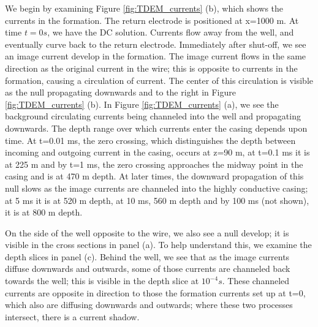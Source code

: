 We begin by examining Figure \ref{fig:TDEM_currents} (b), which shows the currents in the formation. The return electrode is positioned at x=1000 m. At time $t=0s$, we have the DC solution. Currents flow away from the well, and eventually curve back to the return electrode. Immediately after shut-off, we see an image current develop in the formation. The image current flows in the same direction as the original current in the wire; this is opposite to currents in the formation, causing a circulation of current. The center of this circulation is visible as the null propagating downwards and to the right in Figure \ref{fig:TDEM_currents} (b). In Figure \ref{fig:TDEM_currents} (a), we see the background circulating currents being channeled into the well and propagating downwards. The depth range over which currents enter the casing depends upon time. At t=0.01 ms, the zero crossing, which distinguishes the depth between incoming and outgoing current in the casing, occurs at z=90 m, at t=0.1 ms it is at 225 m and by t=1 ms, the zero crossing approaches the midway point in the casing and is at 470 m depth. At later times, the downward propagation of this null slows as the image currents are channeled into the highly conductive casing; at 5 ms it is at 520 m depth, at 10 ms, 560 m depth and by 100 ms (not shown), it is at 800 m depth.

On the side of the well opposite to the wire, we also see a null develop; it is visible in the cross sections in panel (a). To help understand this, we examine the depth slices in panel (c). Behind the well, we see that as the image currents diffuse downwards and outwards, some of those currents are channeled back towards the well; this is visible in the depth slice at $10^{-4} s$. These channeled currents are opposite in direction to those the formation currents set up at t=0, which also are diffusing downwards and outwards; where these two processes intersect, there is a current shadow.

